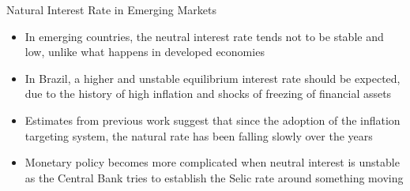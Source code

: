 \documentclass[9pt]{beamer}
\begin{document}
\begin{frame}{Natural Interest Rate in Emerging Markets}
\begin{itemize}
    \item In emerging countries, the neutral interest rate tends not to be stable and low, unlike what happens in developed economies \textcolor{red}{\citet{Carrillo:2018}}
    
    \item In Brazil, a higher and unstable equilibrium interest rate should be expected, due to the history of high inflation and shocks of freezing of financial assets \textcolor{red}{\citet{Portugal:2009}}
    
    \item Estimates from previous work suggest that since the adoption of the inflation targeting system, the natural rate has been falling slowly over the years \textcolor{red}{\citet{Moreira:2019}}

    \item Monetary policy becomes more complicated when neutral interest is unstable as the Central Bank tries to establish the Selic rate around something moving
    
   

\end{itemize}
\end{frame}
\end{document}
